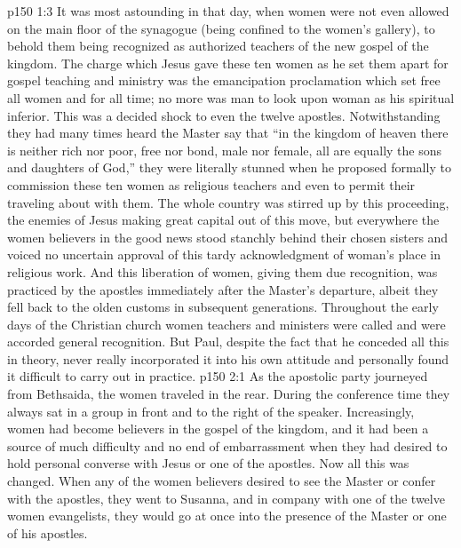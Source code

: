 \vs p150 1:3 It was most astounding in that day, when women were not even allowed on the main floor of the synagogue (being confined to the women’s gallery), to behold them being recognized as authorized teachers of the new gospel of the kingdom. The charge which Jesus gave these ten women as he set them apart for gospel teaching and ministry was the emancipation proclamation which set free all women and for all time; no more was man to look upon woman as his spiritual inferior. This was a decided shock to even the twelve apostles. Notwithstanding they had many times heard the Master say that \textcolor{ubdarkred}{“in the kingdom of heaven there is neither rich nor poor, free nor bond, male nor female, all are equally the sons and daughters of God,”} they were literally stunned when he proposed formally to commission these ten women as religious teachers and even to permit their traveling about with them. The whole country was stirred up by this proceeding, the enemies of Jesus making great capital out of this move, but everywhere the women believers in the good news stood stanchly behind their chosen sisters and voiced no uncertain approval of this tardy acknowledgment of woman’s place in religious work. And this liberation of women, giving them due recognition, was practiced by the apostles immediately after the Master’s departure, albeit they fell back to the olden customs in subsequent generations. Throughout the early days of the Christian church women teachers and ministers were called  and were accorded general recognition. But Paul, despite the fact that he conceded all this in theory, never really incorporated it into his own attitude and personally found it difficult to carry out in practice.
\vs p150 2:1 As the apostolic party journeyed from Bethsaida, the women traveled in the rear. During the conference time they always sat in a group in front and to the right of the speaker. Increasingly, women had become believers in the gospel of the kingdom, and it had been a source of much difficulty and no end of embarrassment when they had desired to hold personal converse with Jesus or one of the apostles. Now all this was changed. When any of the women believers desired to see the Master or confer with the apostles, they went to Susanna, and in company with one of the twelve women evangelists, they would go at once into the presence of the Master or one of his apostles.
